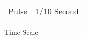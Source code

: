\begin{SHTable}
\begin{tabular}{ll} 
	Pulse      & 1/10 Second	\\
	\end{tabular}
	\caption{Time Scale}	
\end{SHTable}
